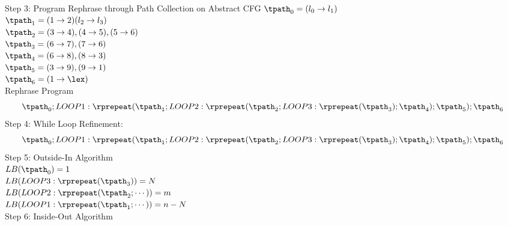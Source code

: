 Step 3: Program Rephrase through Path Collection on Abstract CFG
$\tpath_0 = (l_0 \to l_1)$
\\
$\tpath_1 = (1 \to 2) (l_2 \to l_3)$
\\
$\tpath_2 = (3 \to 4), (4 \to 5), (5 \to 6)$
\\
$\tpath_3 = (6 \to 7), (7 \to 6)$
\\
$\tpath_4 = (6 \to 8), (8 \to 3)$
\\
$\tpath_5 = (3 \to 9), (9 \to 1)$
\\
$\tpath_6 = (1 \to \lex)$
\\
Rephrase Program
\[
\tpath_0 ; LOOP1: \rprepeat(\tpath_1; LOOP2: \rprepeat(\tpath_2; LOOP3 : \rprepeat(\tpath_3); \tpath_4); \tpath_5); \tpath_6
\]
Step 4: While Loop Refinement:
\[
\tpath_0 ; LOOP1: \rprepeat(\tpath_1; LOOP2: \rprepeat(\tpath_2; LOOP3 : \rprepeat(\tpath_3); \tpath_4); \tpath_5); \tpath_6
\]
Step 5: Outside-In Algorithm
\\
$LB(\tpath_0) = 1$
\\
$LB(LOOP3 : \rprepeat(\tpath_3)) = N $
\\
$LB(LOOP2: \rprepeat(\tpath_2; \cdots)) = m $
\\
$LB(LOOP1: \rprepeat(\tpath_1; \cdots)) = n - N $
\\
Step 6: Inside-Out Algorithm
